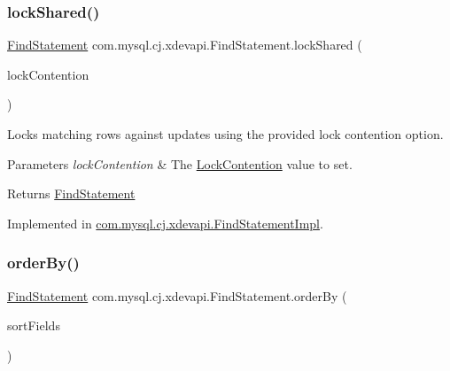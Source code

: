 \subsubsection{\texorpdfstring{lock\+Shared()}{lockShared()}\hspace{0.1cm}{\footnotesize\ttfamily [2/2]}}
{\footnotesize\ttfamily \mbox{\hyperlink{interfacecom_1_1mysql_1_1cj_1_1xdevapi_1_1_find_statement}{Find\+Statement}} com.\+mysql.\+cj.\+xdevapi.\+Find\+Statement.\+lock\+Shared (\begin{DoxyParamCaption}\item[{Lock\+Contention}]{lock\+Contention }\end{DoxyParamCaption})}

Locks matching rows against updates using the provided lock contention option.


\begin{DoxyParams}{Parameters}
{\em lock\+Contention} & The \mbox{\hyperlink{}{Lock\+Contention}} value to set. \\
\hline
\end{DoxyParams}
\begin{DoxyReturn}{Returns}
\mbox{\hyperlink{interfacecom_1_1mysql_1_1cj_1_1xdevapi_1_1_find_statement}{Find\+Statement}} 
\end{DoxyReturn}


Implemented in \mbox{\hyperlink{classcom_1_1mysql_1_1cj_1_1xdevapi_1_1_find_statement_impl_aecf5ef40361b9b8646b416543c82d2d4}{com.\+mysql.\+cj.\+xdevapi.\+Find\+Statement\+Impl}}.

\mbox{\label{interfacecom_1_1mysql_1_1cj_1_1xdevapi_1_1_find_statement_a0542751a290783fd73d1049dff5f8163}} 
\subsubsection{\texorpdfstring{order\+By()}{orderBy()}}
{\footnotesize\ttfamily \mbox{\hyperlink{interfacecom_1_1mysql_1_1cj_1_1xdevapi_1_1_find_statement}{Find\+Statement}} com.\+mysql.\+cj.\+xdevapi.\+Find\+Statement.\+order\+By (\begin{DoxyParamCaption}\item[{String...}]{sort\+Fields }\end{DoxyParamCaption})}

